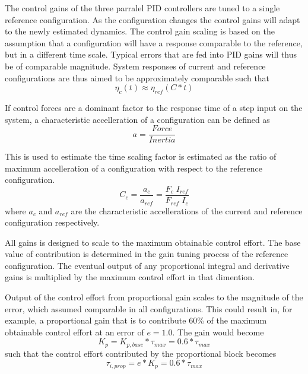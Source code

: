 The control gains of the three parralel PID controllers are tuned to a single reference configuration. As the configuration changes the control gains will adapt to the newly estimated dynamics. 
The control gain scaling is based on the assumption that a configuration will have a response comparable to the reference, but in a different time scale. Typical errors that are fed into PID gains will thus be of comparable magnitude. System responses of current and reference configurations are thus aimed to be approximately comparable such that
\begin{equation}
	\eta_{c}(t) \approx \eta_{ref}(C*t)
	\label{eq:timescaling}
\end{equation}


 If control forces are a dominant factor to the response time of a step input on the system, a characteristic accelleration of a configuration can be defined as
\begin{equation}
a = \frac{Force}{Inertia}
\end{equation}

This is used to estimate the time scaling factor is estimated as the ratio of maximum accelleration of a configuration with respect to the reference configuration. 
\begin{equation}
C_{c} = \frac{a_{c}}{a_{ref}} = \frac{F_{c} \; I_{ref}}{F_{ref} \; I_{c}}
\label{eq:timescaleDef}
\end{equation}
where $ a_{c}$ and $a_{ref}$ are the characteristic accellerations of the current and reference configuration respectively. 

All gains is designed to scale to the maximum obtainable control effort. The base value of contribution is determined in the gain tuning process of the reference configuration. The eventual output of any proportional integral and derivative gains is multiplied by the maximum control effort in that dimention. 

Output of the control effort from proportional gain scales to the magnitude of the error, which assumed comparable in all configurations.  This could result in, for example, a proportional gain that is to contribute 60\% of the maximum obtainable control effort at an error of $e = 1.0$. The gain would become 
\begin{equation}
	K_{p} = K_{p,base}* \tau_{max} =  0.6* \tau_{max}
\end{equation}
such that the control effort contributed by the proportional block becomes
\begin{equation}
	\tau_{i,prop} = e * K_{p} = 0.6* \tau_{max}
\end{equation}

